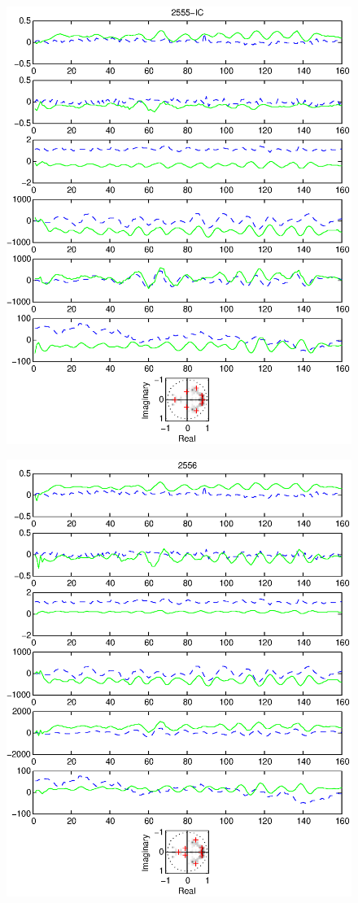 \documentclass{article}
\begin{document}
\begin{figure}[htb!]\centering
\includegraphics{2555_ic.eps}
\end{figure}\clearpage
\begin{figure}[htb!]\centering
\includegraphics{2556.eps}
\end{figure}\clearpage
\end{document}
